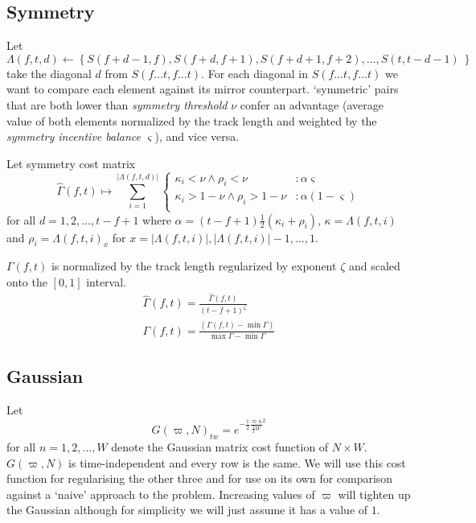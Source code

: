\documentclass[twocolumn]{article}
\begin{document}
\subsection{Symmetry}

Let \begin{dmath*}
	\Lambda( f,t,d ) \leftarrow \left\{ 
	S(f+d-1,f), S(f+d, f+1), S(f+d+1, f+2),\ldots, S(t, t-d-1)
	~ \right\} 
\end{dmath*}take the diagonal $d$ from $S( f \ldots t, f \ldots t )$. For each diagonal in $S( f \ldots t, f \ldots t )$ we want to compare each element against its mirror counterpart. `symmetric' pairs that are both lower than \textit{symmetry threshold} $\nu$ confer an advantage (average value of both elements normalized by the track length and weighted by the \textit{symmetry incentive balance} $\varsigma$), and vice versa.

Let symmetry cost matrix
\begin{dmath*}\hat\Gamma(f, t) \mapsto  \sum_{i=1}^{|\Lambda( f,t,d )|}{ \left\{
		\begin{array}{lr}
			\kappa_{i} < \nu \land \rho_i < \nu & : \alpha\varsigma   \\
			\kappa_{i} > 1-\nu \land \rho_i > 1-\nu & : \alpha(1-\varsigma)   \\
		\end{array}
		\right.}
\end{dmath*} for all $d=1,2,\ldots,t-f+1$ where $\alpha=(t-f+1)\frac{1}{2}\left(\kappa_{i}+\rho_{i}\right)$, $\kappa=\Lambda( f,t,i )$ and $\rho_i = \Lambda( f,t,i )_x$ for $x=|\Lambda( f,t,i )|, |\Lambda( f,t,i )|-1,\ldots,1$.

$\Gamma(f, t)$ is normalized by the track length regularized by exponent $\zeta$ and scaled onto the $[0,1]$ interval.
\begin{multline*}
\hat\Gamma(f, t) = \frac{\hat\Gamma(f, t)}{(t-f+1)^\zeta}  \\
\Gamma(f, t) = \frac{ \left( \Gamma(f, t) - \min \Gamma \right) }{ \max \Gamma -\min \Gamma  }
\end{multline*} 

\subsection{Gaussian}
Let \[
G( \varpi, N )_{tw} = e^{ - \frac{1}{2} \frac{\varpi n}{ \frac{1}{2} W}^2  }
\] for all $n=1,2,\ldots,W$ denote the Gaussian matrix cost function of $N\times W$. $G( \varpi, N )$ is time-independent and every row is the same. We will use this cost function for regularising the other three and for use on its own for comparison against a `naive' approach to the problem. Increasing values of $\varpi$ will tighten up the Gaussian although for simplicity we will just assume it has a value of $1$.
\end{document}
